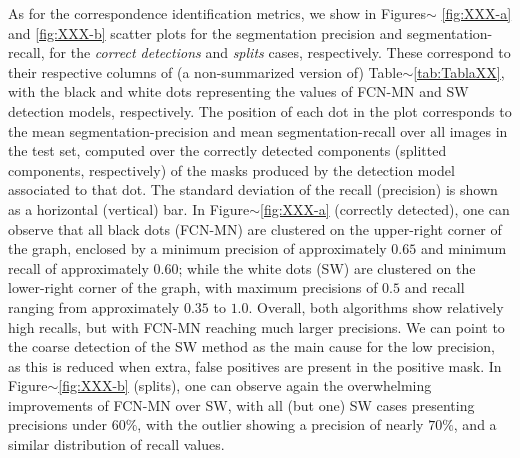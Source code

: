 \documentclass[a4paper,authoryear,review]{elsarticle}
\begin{document}
As for the correspondence identification metrics, we show in Figures$\sim$ \ref{fig:XXX-a} and \ref{fig:XXX-b} scatter plots for the segmentation precision and segmentation-recall, for the \emph{correct detections} and \emph{splits} cases, respectively. These correspond to their respective columns of (a non-summarized version of) Table$\sim$\ref{tab:TablaXX}, with the black and white dots representing the values of FCN-MN and SW detection models, respectively. The position of each dot in the plot corresponds to the mean segmentation-precision and mean segmentation-recall over all images in the test set, computed over the correctly detected components (splitted components, respectively) of the masks produced by the detection model associated to that dot. The standard deviation of the recall (precision) is shown as a horizontal (vertical) bar.
%
In Figure$\sim$\ref{fig:XXX-a} (correctly detected), one can observe that all black dots (FCN-MN) are clustered on the upper-right corner of the graph, enclosed by a minimum precision of approximately $0.65$ and minimum recall of approximately $0.60$; while the white dots (SW) are clustered on the lower-right corner of the graph, with maximum precisions of $0.5$ and recall ranging from approximately $0.35$ to $1.0$. Overall, both algorithms show relatively high recalls, but with FCN-MN reaching much larger precisions. We can point to the coarse detection of the SW method as the main cause for the low precision, as this is reduced when extra, false positives are present in the positive mask. 
%
In Figure$\sim$\ref{fig:XXX-b} (splits), one can observe again the overwhelming improvements of FCN-MN over SW, with all (but one) SW cases presenting precisions under $60\%$, with the outlier showing a precision of nearly  $70\%$, and a similar distribution of recall values.  
\end{document}
